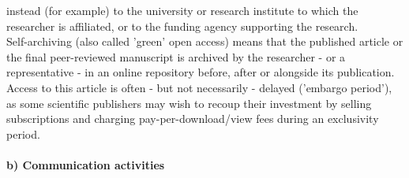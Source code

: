 {\begin{compactitem}
    instead (for example) to the university or research institute to which the
    researcher is affiliated, or to the funding agency supporting the research.\\
%
    Self-archiving (also called 'green' open access) means that the published
    article or the final peer-reviewed manuscript is archived by the researcher
    - or a representative - in an online repository before, after or alongside
    its publication.  Access to this article is often - but not necessarily -
    delayed ('embargo period'), as some scientific publishers may wish to recoup
    their investment by selling subscriptions and charging pay-per-download/view
    fees during an exclusivity period.
%
  \end{compactitem}
}

\paragraph{b) Communication activities}


